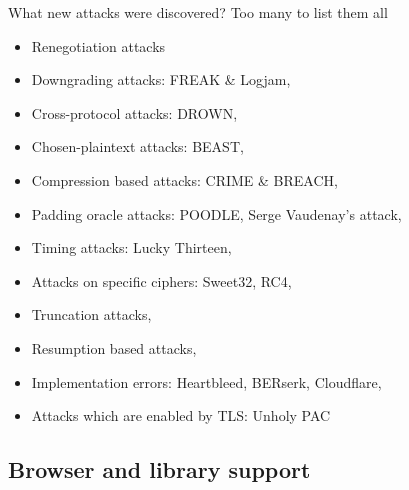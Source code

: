 \documentclass{f4_beamer_metropolis}
\begin{document}
\begin{frame}{What new attacks were discovered?}
Too many to list them all
  \begin{itemize}
    \item Renegotiation attacks
    \item Downgrading attacks: FREAK \& Logjam,
    \item Cross-protocol attacks: DROWN,
    \item Chosen-plaintext attacks: BEAST,
    \item Compression based attacks: CRIME \& BREACH,
    \item Padding oracle attacks: POODLE, Serge Vaudenay's attack,
    \item Timing attacks: Lucky Thirteen,
    \item Attacks on specific ciphers: Sweet32, RC4,
    \item Truncation attacks,
    \item Resumption based attacks,
    \item Implementation errors: Heartbleed, BERserk, Cloudflare,
    \item Attacks which are enabled by TLS: Unholy PAC
  \end{itemize}

\end{frame}


\subsection{Browser and library support}
\end{document}
